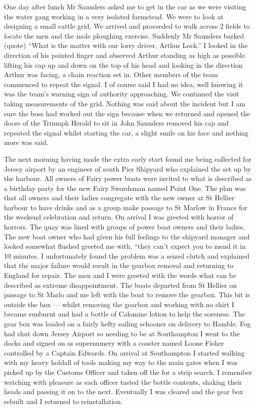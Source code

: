 One day after lunch Mr Saunders asked me to get in the car as we were visiting
the water gang working in a very isolated farmstead. We were to look at
designing a small cattle grid. We arrived and proceeded to walk across 2 fields
to locate the men and the mole ploughing exercise. Suddenly Mr Saunders barked
(quote) ``What is the matter with our lorry driver, Arthur Lock.'' I looked in
the direction of his pointed finger and observed Arthur standing as high as
possible lifting his cap up and down on the top of his head and looking in the
direction Arthur was facing, a chain reaction set in. Other members of the team
commenced to repeat the signal. I of course said I had no idea, well knowing it
was the team's warning sign of authority approaching. We continued the visit
taking measurements of the grid. Nothing was said about the incident but I am
sure the boss had worked out the sign because when we returned and opened the
doors of the Triumph Herald to sit in John Saunders removed his cap and
repeated the signal whilst starting the car, a slight smile on his face and
nothing more was said.

The next morning having made the extra early start found me being collected for
Jersey airport by an engineer of south Pier Shipyard who explained the set up
by the harbour. All owners of Fairy power boats were invited to what is
described as a birthday party for the new Fairy Swordsman named Point One. The
plan was that all owners and their ladies congregate with the new owner at St
Hellier harbour to have drinks and as a group make passage to St Marlow in
France for the weekend celebration and return. On arrival I was greeted with
horror of horrors. The quay was lined with groups of power boat owners and
their ladies. The new boat owner who had given his full feelings to the
shipyard manager and looked somewhat flushed greeted me with, ``they can't
expect you to mend it in 10 minutes. I unfortunately found the problem was a
seized clutch and explained that the major failure would result in the gearbox
removal and returning to England for repair. The men and I were greeted with
the words what can be described as extreme disappointment. The boats departed
from St Hellier on passage to St Marlo and me left with the boat to remove the
gearbox. This bit is outside the box --- whilst removing the gearbox and
working with no shirt I became sunburnt and had a bottle of Calomine lotion to
help the soreness. The gear box was loaded on a fairly hefty sailing schooner
on delivery to Hamble. Fog had shut down Jersey Airport so needing to be at
Southampton I went to the docks and signed on as supernumery with a coaster
named Loone Fisher controlled by a Captain Edwards. On arrival at Southampton I
started walking with my heavy holdall of tools making my way to the main gates
when I was picked up by the Customs Officer and taken off the for a strip
search. I remember watching with pleasure as each officer tasted the bottle
contents, shaking their heads and passing it on to the next. Eventually I was
cleared and the gear box rebuilt and I returned to reinstallation.

